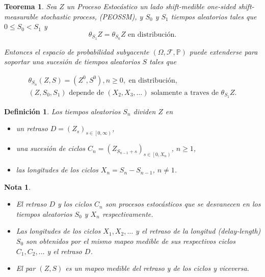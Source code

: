 \documentclass{article}
\newtheorem{Def}{Definición}[section]
\newtheorem{Teo}{Teorema}[section]
\newtheorem{Note}{Nota}[section]
\newcommand{\prob}{\mathbb{P}}
\numberwithin{equation}{section}
\begin{document}
\begin{Teo}
Sea $Z$ un Proceso Estoc\'astico un lado shift-medible \textit{one-sided shift-measurable stochastic process}, (PEOSSM), y $S_{0}$ y $S_{1}$ tiempos aleatorios tales que $0\leq S_{0}<S_{1}$ y
\begin{equation}
\theta_{S_{1}}Z=\theta_{S_{0}}Z\textrm{ en distribuci\'on}.
\end{equation}

Entonces el espacio de probabilidad subyacente $\left(\Omega,\mathcal{F},\prob\right)$ puede extenderse para soportar una sucesi\'on de tiempos aleatorios $S$ tales que

\begin{eqnarray}
\theta_{S_{n}}\left(Z,S\right)=\left(Z^{0},S^{0}\right),n\geq0,\textrm{ en distribuci\'on},\\
\left(Z,S_{0},S_{1}\right)\textrm{ depende de }\left(X_{2},X_{3},\ldots\right)\textrm{ solamente a traves de }\theta_{S_{1}}Z.
\end{eqnarray}
\end{Teo}

\begin{Def}
Los tiempos aleatorios $S_{n}$ dividen $Z$ en 
\begin{itemize}
\item[a)] un retraso $D=\left(Z_{s}\right)_{s\in\left[0,\infty\right)}$,
\item[b)] una sucesi\'on de ciclos $C_{n}=\left(Z_{S_{n-1}+s}\right)_{ s\in\left[0,X_{n}\right)}$, $n\geq1$,
\item[c)] las longitudes de los ciclos $X_{n}=S_{n}-S_{n-1}$, $n\neq1$.
\end{itemize}
\end{Def}

\begin{Note}
\begin{itemize}
\item[a)] El retraso $D$ y los ciclos $C_{n}$ son procesos estoc\'asticos que se desvanecen en los tiempos aleatorios $S_{0}$ y $X_{n}$ respectivamente.
\item[b)] Las longitudes de los ciclos $X_{1},X_{2},\ldots$ y el retraso de la longitud (\textit{delay-length}) $S_{0}$ son obtenidos por el mismo mapeo medible de sus respectivos ciclos $C_{1},C_{2},\ldots$ y el retraso $D$. 
\item[c)] El par $\left(Z,S\right)$ es un mapeo medible del retraso y de los ciclos y viceversa.
\end{itemize}
\end{Note}
\end{document}
